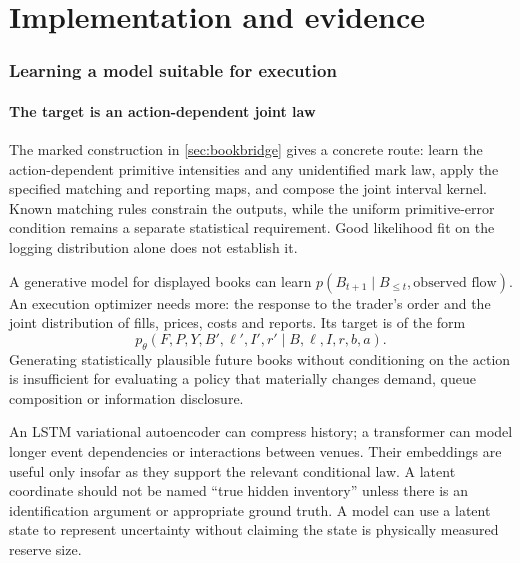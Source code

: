 \documentclass[11pt]{article}
\numberwithin{equation}{section}
\theoremstyle{definition}
\theoremstyle{remark}
\theoremstyle{definition}
\begin{document}




\clearpage
\part{Implementation and evidence}\label{pt:impl}
\section{Learning a model suitable for execution}\label{sec:learning}

\subsection{The target is an action-dependent joint law}

The marked construction in \cref{sec:bookbridge} gives a concrete route:
learn the action-dependent primitive intensities and any unidentified mark
law, apply the specified matching and reporting maps, and compose the joint
interval kernel. Known matching rules constrain the outputs, while the
uniform primitive-error condition remains a separate statistical requirement.
Good likelihood fit on the logging distribution alone does not establish it.

A generative model for displayed books can learn
$p(B_{t+1}\mid B_{\leq t},\text{observed flow})$. An execution optimizer needs
more: the response to the trader's order and the joint distribution of fills,
prices, costs and reports. Its target is of the form
\begin{equation}\label{eq:jointlearn}
 p_\theta(F,P,Y,B',\ell',I',r'\mid B,\ell,I,r,b,a).
\end{equation}
Generating statistically plausible future books without conditioning on the
action is insufficient for evaluating a policy that materially changes demand,
queue composition or information disclosure.

An LSTM variational autoencoder can compress history; a transformer can model
longer event dependencies or interactions between venues. Their embeddings
are useful only insofar as they support the relevant conditional law. A latent
coordinate should not be named ``true hidden inventory'' unless there is an
identification argument or appropriate ground truth. A model can use a latent
state to represent uncertainty without claiming the state is physically
measured reserve size.
\end{document}
